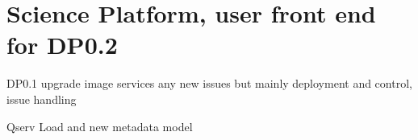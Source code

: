 \section{Science Platform, user front end for DP0.2 } \label{sec:frontend}

DP0.1 upgrade image services any new issues  but mainly deployment and control, issue handling

Qserv Load and new metadata model
